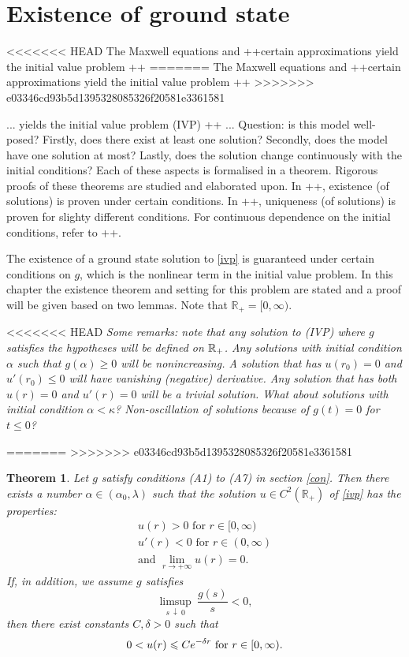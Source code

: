 \newtheorem{thmx}{Theorem}
\renewcommand{\thethmx}{\Alph{thmx}}
\section{Existence of ground state}
<<<<<<< HEAD
The Maxwell equations and ++certain approximations yield the initial value problem ++
=======
The Maxwell equations and ++certain approximations yield the initial value problem ++   
>>>>>>> e03346cd93b5d1395328085326f20581e3361581

... yields the initial value problem (IVP) ++ ... Question: is this model well-posed? Firstly, does there exist at least one solution? Secondly, does the model have one solution at most? Lastly, does the solution change continuously with the initial conditions? Each of these aspects is formalised in a theorem. Rigorous proofs of these theorems are studied and elaborated upon. In ++, existence (of solutions) is proven under certain conditions. In ++, uniqueness (of solutions) is proven for slighty different conditions. For continuous dependence on the initial conditions, refer to ++.

The existence of a ground state solution to \eqref{ivp} is guaranteed under certain conditions on $g$, which is the nonlinear term in the initial value problem. In this chapter the existence theorem and setting for this problem are stated and a proof will be given based on two lemmas. Note that $\mathbb{R}_+=[0,\infty)$.

<<<<<<< HEAD
\emph{Some remarks: note that any solution to (IVP) where $g$ satisfies the hypotheses will be defined on $\rplus$. Any solutions with initial condition $\alpha$ such that $g(\alpha) \geq 0$ will be nonincreasing. A solution that has $u(r_0)=0$ and $u'(r_0)\leq0$ will have vanishing (negative) derivative. Any solution that has both $u(r)=0$ and $u'(r)=0$ will be a trivial solution. What about solutions with initial condition $\alpha<\kappa$? Non-oscillation of solutions because of $g(t)=0$ for $t\leq0$?}

=======
>>>>>>> e03346cd93b5d1395328085326f20581e3361581
\begin{thmx}\label{exithm}
Let $g$ satisfy conditions (A1) to (A7) in section \ref{con}. Then there exists a number $\alpha\in(\alpha_0,\lambda)$ such that the solution $u\in C^2(\mathbb{R}_+)$ of \eqref{ivp} has the properties: \begin{gather*}u(r)>0\text{ for }r\in[0,\infty)\\u'(r)<0\text{ for }r\in(0,\infty)\\ \text{and }\lim_{r\to+\infty}u(r)=0.\end{gather*} If, in addition, we assume $g$ satisfies $$\limsup_{s~\downarrow~0}~\frac{g(s)}{s}<0,$$ then there exist constants $C,\delta>0$ such that $$0<u(r)\leq Ce^{-\delta r} ~~ \textnormal{for} ~ r\in[0,\infty).$$
\end{thmx}

